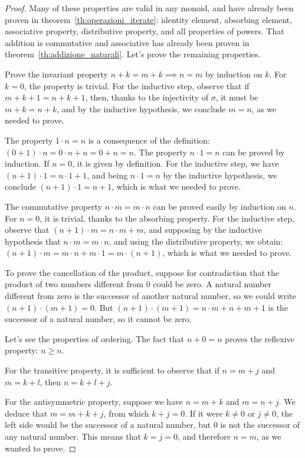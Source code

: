 \begin{proof}
Many of these properties are valid in any monoid, and have already 
been proven in theorem~\ref{th:operazioni_iterate}:
identity element, absorbing element, associative property, 
distributive property, and all properties of powers.
That addition is commutative and associative has already been proven 
in theorem~\ref{th:addizione_naturali}.
Let's prove the remaining properties.

Prove the invariant property $n+k=m+k \implies n=m$ 
by induction on $k$.
For $k=0$, the property is trivial.  
For the inductive step, observe that if $m+k+1=n+k+1$,
then, thanks to the injectivity of $\sigma$, 
it must be $m+k = n+k$,
and by the inductive hypothesis, we conclude $m=n$, as we needed to prove.
  
The property $1\cdot n=n$ is a consequence 
of the definition: $(0+1)\cdot n = 0\cdot n + n = 0 + n = n$. 
The property $n\cdot 1=n$ can be proved by induction.
If $n=0$, it is given by definition. 
For the inductive step, we have $(n+1)\cdot 1 = n\cdot 1 + 1$,
and being $n\cdot 1=n$ by the inductive hypothesis, 
we conclude $(n+1)\cdot 1 = n+1$, which is what we needed to prove.

The commutative property $n\cdot m=m\cdot n$ can be proved 
easily by induction on $n$. 
For $n=0$, it is trivial, thanks to the absorbing property.
For the inductive step, observe that $(n+1)\cdot m = n\cdot m + m$,
and supposing by the inductive hypothesis that $n\cdot m=m\cdot n$, 
and using the distributive property, we obtain:
$(n+1)\cdot m = m\cdot n + m\cdot 1 = m\cdot (n+1)$,
which is what we needed to prove.

To prove the cancellation of the product, suppose for contradiction that 
the product of two numbers different from $0$ could be zero.
A natural number different from zero is the successor of another natural number,
so we could write $(n+1)\cdot(m+1)=0$. 
But $(n+1)\cdot(m+1) = n\cdot m + n + m + 1$ is the successor of a natural
number,
so it cannot be zero.

Let's see the properties of ordering.
The fact that $n+0=n$ proves the reflexive property: $n\ge n$.
  
For the transitive property, it is sufficient to observe
that if $n=m+j$ and $m=k+l$, then $n=k+l+j$.

For the antisymmetric property, suppose we have $n=m+k$ 
and $m=n+j$. 
We deduce that $ m = m+k+j$, from which $k+j=0$.
If it were $k\neq 0$ or $j\neq 0$, the left side would be the successor 
of a natural number, but $0$ is not the successor of any natural number.
This means that $k=j=0$, and therefore $n=m$, as we wanted to prove.


\end{proof}
